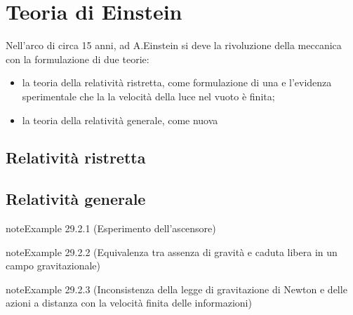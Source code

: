 \documentclass[letterpaper,10pt,italian]{jupyterBook}
\begin{document}
\sphinxstepscope


\chapter{Teoria di Einstein}
\label{\detokenize{ch/modern/einstein:teoria-di-einstein}}\label{\detokenize{ch/modern/einstein:physics-hs-modern-einstein}}\label{\detokenize{ch/modern/einstein::doc}}
\sphinxAtStartPar
Nell’arco di circa 15 anni, ad A.Einstein si deve la rivoluzione della meccanica con la formulazione di due teorie:
\begin{itemize}
\item {} 
\sphinxAtStartPar
la teoria della relatività ristretta, come formulazione di una  e l’evidenza sperimentale che la la velocità della luce nel vuoto è finita;

\item {} 
\sphinxAtStartPar
la teoria della relatività generale, come nuova 

\end{itemize}


\section{Relatività ristretta}
\label{\detokenize{ch/modern/einstein:relativita-ristretta}}\label{\detokenize{ch/modern/einstein:physics-hs-modern-einstein-special}}

\section{Relatività generale}
\label{\detokenize{ch/modern/einstein:relativita-generale}}\label{\detokenize{ch/modern/einstein:physics-hs-modern-einstein-general}}\label{ch/modern/einstein:example-0}
\begin{sphinxadmonition}{note}{Example 29.2.1 (Esperimento dell’ascensore)}


\end{sphinxadmonition}
\label{ch/modern/einstein:example-1}
\begin{sphinxadmonition}{note}{Example 29.2.2 (Equivalenza tra assenza di gravità e caduta libera in un campo gravitazionale)}


\end{sphinxadmonition}
\label{ch/modern/einstein:example-2}
\begin{sphinxadmonition}{note}{Example 29.2.3 (Inconsistenza della legge di gravitazione di Newton e delle azioni a distanza con la velocità finita delle informazioni)}


\end{sphinxadmonition}
\end{document}
